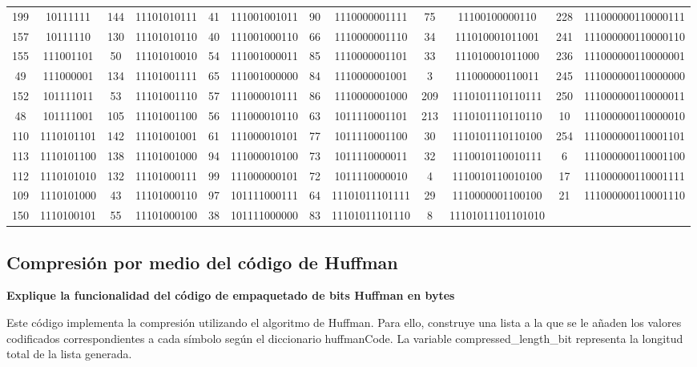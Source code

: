 \documentclass[conference,onecolumn,12pt]{IEEEtran}
\numberwithin{equation}{subsection}
\begin{document}
\begin{itemize}
\begin{table}[H]
\begin{tabular}{cccccccccccc}
199 & 10111111 & 144 & 11101010111 & 41 & 111001001011 & 90 & 1110000001111 & 75 & 11100100000110 & 228 & 111000000110000111 \\
157 & 10111110 & 130 & 11101010110 & 40 & 111001000110 & 66 & 1110000001110 & 34 & 111010001011001 & 241 & 111000000110000110 \\
155 & 111001101 & 50 & 11101010010 & 54 & 111001000011 & 85 & 1110000001101 & 33 & 111010001011000 & 236 & 111000000110000001 \\
49 & 111000001 & 134 & 11101001111 & 65 & 111001000000 & 84 & 1110000001001 & 3 & 111000000110011 & 245 & 111000000110000000 \\
152 & 101111011 & 53 & 11101001110 & 57 & 111000010111 & 86 & 1110000001000 & 209 & 1110101110110111 & 250 & 111000000110000011 \\
48 & 101111001 & 105 & 11101001100 & 56 & 111000010110 & 63 & 1011110001101 & 213 & 1110101110110110 & 10 & 111000000110000010 \\
110 & 1110101101 & 142 & 11101001001 & 61 & 111000010101 & 77 & 1011110001100 & 30 & 1110101110110100 & 254 & 111000000110001101 \\
113 & 1110101100 & 138 & 11101001000 & 94 & 111000010100 & 73 & 1011110000011 & 32 & 1110010110010111 & 6 & 111000000110001100 \\
112 & 1110101010 & 132 & 11101000111 & 99 & 111000000101 & 72 & 1011110000010 & 4 & 1110010110010100 & 17 & 111000000110001111 \\
109 & 1110101000 & 43 & 11101000110 & 97 & 101111000111 & 64 & 11101011101111 & 29 & 1110000001100100 & 21 & 111000000110001110 \\
150 & 1110100101 & 55 & 11101000100 & 38 & 101111000000 & 83 & 11101011101110 & 8 & 11101011101101010 \\
\bottomrule
\end{tabular}
\end{table}
    
\end{itemize}


\subsection{Compresión por medio del código de Huffman}

\textbf{Explique la funcionalidad del código de empaquetado de bits Huffman en bytes}

Este código implementa la compresión utilizando el algoritmo de Huffman. Para ello, construye una lista a la que se le añaden los valores codificados correspondientes a cada símbolo según el diccionario huffmanCode. La variable compressed\_length\_bit representa la longitud total de la lista generada.
\end{document}
